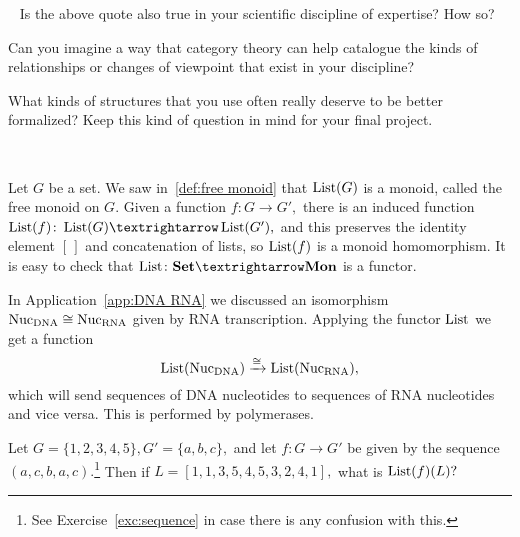 \documentclass[../main/CT4S-EN-RU]{subfiles}
\begin{document}
\begin{remarkRUS}
\end{remarkRUS}

\begin{exerciseENG}~
\sexc Is the above quote also true in your scientific discipline of expertise? How so? 
\item Can you imagine a way that category theory can help catalogue the kinds of relationships or changes of viewpoint that exist in your discipline? 
\item What kinds of structures that you use often really deserve to be better formalized?
\endsexc
Keep this kind of question in mind for your final project.
\end{exerciseENG}

\begin{exerciseRUS}~
\end{exerciseRUS}

\begin{exampleENG}\label{ex:free monoid}
Let $G$ be a set. We saw in~\ref{def:free monoid} that $\operatorname{List}(G)$ is a monoid, called the free monoid on $G.$ Given a function $f\colon G{→} G',$ there is an induced function $\List(f)\colon\List(G){→}\List(G'),$ and this preserves the identity element $[\,]$ and concatenation of lists, so $\operatorname{List}(f)$ is a monoid homomorphism. It is easy to check that $\List\colon\Set{→}\Mon$ is a functor.
\end{exampleENG}

\begin{exampleRUS}\label{ex:free monoid}
\end{exampleRUS}

\begin{applicationENG}\label{app:polymerase}
In Application~\ref{app:DNA RNA} we discussed an isomorphism $\textnormal{Nuc}_\textnormal{DNA}\cong\textnormal{Nuc}_\textnormal{RNA}$ given by RNA transcription. Applying the functor $\operatorname{List}$ we get a function $$\operatorname{List}(\textnormal{Nuc}_\textnormal{DNA})\xrightarrow{\cong}\operatorname{List}(\textnormal{Nuc}_\textnormal{RNA}),$$ which will send sequences of DNA nucleotides to sequences of RNA nucleotides and vice versa. This is performed by polymerases.
\end{applicationENG}

\begin{applicationRUS}\label{app:polymerase}
\end{applicationRUS}

\begin{exerciseENG}\label{exc:list as functor}
Let $G=\{1,2,3,4,5\}, G'=\{a,b,c\},$ and let $f\colon G{→} G'$ be given by the sequence $(a,c,b,a,c).$\footnote{See Exercise~\ref{exc:sequence} in case there is any confusion with this.} Then if $L=[1,1,3,5,4,5,3,2,4,1],$ what is $\operatorname{List}(f)(L)?$
\end{exerciseENG}
\end{document}
